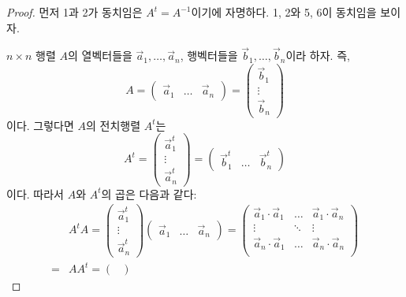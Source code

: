\documentclass[sections/engineering_mathematics_lecture_note.tex]{subfiles}
\begin{document}
\begin{proof}
    먼저 1과 2가 동치임은 $A^t = A^{-1}$이기에 자명하다.
    1, 2와 5, 6이 동치임을 보이자.

    $n \times n$ 행렬 $A$의 열벡터들을 $\vec a_1, \dots, \vec a_n$, 행벡터들을 $\vec b_1, \dots, \vec b_n$이라 하자.
    즉,
    \begin{equation*}
        A =
        \begin{pmatrix}
            \vec a_1 & \dots & \vec a_n
        \end{pmatrix}
        =
        \begin{pmatrix}
            \vec b_1 \\ \vdots \\ \vec b_n
        \end{pmatrix}
    \end{equation*}
    이다.
    그렇다면 $A$의 전치행렬 $A^t$는
    \begin{equation*}
        A^t =
        \begin{pmatrix}
            \vec a_1^t \\ \vdots \\ \vec a_n^t
        \end{pmatrix}
        =
        \begin{pmatrix}
            \vec b_1^t & \dots & \vec b_n^t
        \end{pmatrix}
    \end{equation*}
    이다.
    따라서 $A$와 $A^t$의 곱은 다음과 같다:
    \begin{align*}
        &A^tA =
        \begin{pmatrix}
            \vec a_1^t \\ \vdots \\ \vec a_n^t
        \end{pmatrix}
        \begin{pmatrix}
            \vec a_1 & \dots & \vec a_n
        \end{pmatrix}
        =
        \begin{pmatrix}
            \vec a_1 \cdot \vec a_1 & \dots & \vec a_1 \cdot \vec a_n\\
            \vdots & \ddots & \vdots\\
            \vec a_n \cdot \vec a_1 & \dots & \vec a_n \cdot \vec a_n\\
        \end{pmatrix}
        \\
        = &AA^t =
        \begin{pmatrix}

\end{pmatrix}
\end{align*}
\end{proof}
\end{document}
